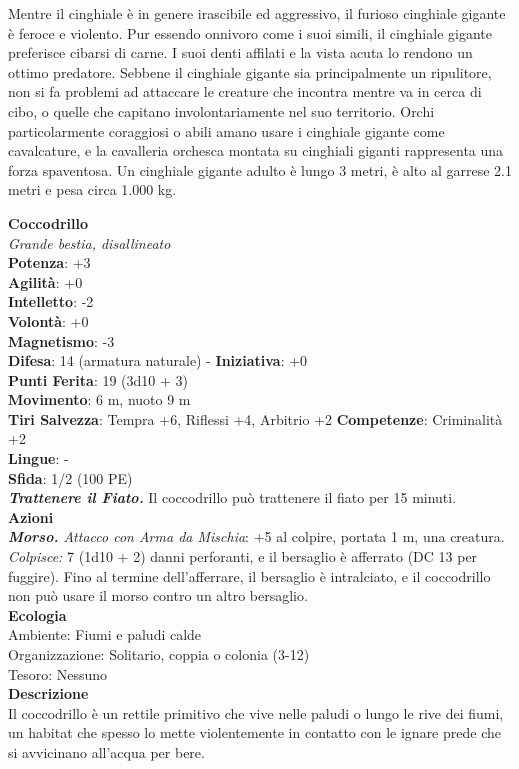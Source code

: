 \begin{multicols}{2}
Mentre il cinghiale è in genere irascibile ed aggressivo, il furioso cinghiale gigante è feroce e violento. Pur essendo onnivoro come i suoi simili, il cinghiale gigante preferisce cibarsi di carne. I suoi denti affilati e la vista acuta lo rendono un ottimo predatore. Sebbene il cinghiale gigante sia principalmente un ripulitore, non si fa problemi ad attaccare le creature che incontra mentre va in cerca di cibo, o quelle che capitano involontariamente nel suo territorio. Orchi particolarmente coraggiosi o abili amano usare i cinghiale gigante come cavalcature, e la cavalleria orchesca montata su cinghiali giganti rappresenta una forza spaventosa. Un cinghiale gigante adulto è lungo 3 metri, è alto al garrese 2.1 metri e pesa circa 1.000 kg.


\medskip\textbf{Coccodrillo}\\
\emph{Grande bestia, disallineato}\\
\textbf{Potenza}: +3\\
\textbf{Agilità}: +0\\
\textbf{Intelletto}: -2\\
\textbf{Volontà}: +0\\
\textbf{Magnetismo}: -3\\
\textbf{Difesa}: 14 (armatura naturale) - \textbf{Iniziativa}: +0\\
\textbf{Punti Ferita}: 19 (3d10 + 3)\\
\textbf{Movimento}: 6 m, nuoto 9 m\\
\textbf{Tiri Salvezza}: Tempra +6, Riflessi +4, Arbitrio +2 
\textbf{Competenze}: Criminalità +2\\
\textbf{Lingue}: -\\
\textbf{Sfida}: 1/2 (100 PE)\smallskip\\
\emph{\textbf{Trattenere il Fiato.}} Il coccodrillo può trattenere il fiato per 15 minuti.\\
\smallskip\textbf{Azioni}\\
\emph{\textbf{Morso.} Attacco con Arma da Mischia}: +5 al colpire, portata 1 m, una creatura.\\
\emph{Colpisce:} 7 (1d10 + 2) danni perforanti, e il bersaglio è afferrato (DC  13 per fuggire). Fino al termine dell'afferrare, il bersaglio è intralciato, e il coccodrillo non può usare il morso contro un altro bersaglio.\\
\textbf{Ecologia}\\
Ambiente: Fiumi e paludi calde\\
Organizzazione: Solitario, coppia o colonia (3-12)\\
Tesoro: Nessuno\\
\textbf{Descrizione}\\
Il coccodrillo è un rettile primitivo che vive nelle paludi o lungo le rive dei fiumi, un habitat che spesso lo mette violentemente in contatto con le ignare prede che si avvicinano all'acqua per bere.\\


\end{multicols}
